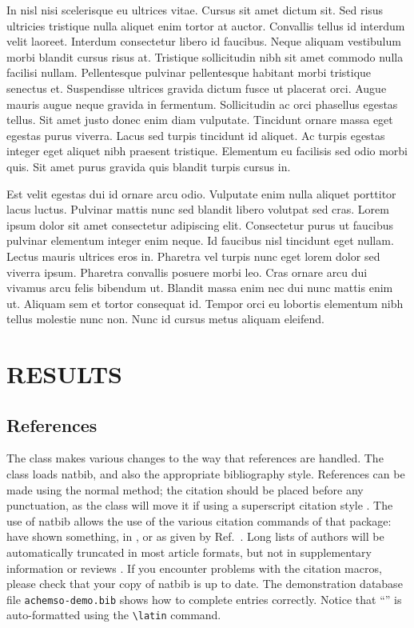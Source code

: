 \documentclass[journal=jctc, manuscript=article]{achemso}
\begin{document}
In nisl nisi scelerisque eu ultrices vitae. Cursus sit amet dictum sit. Sed risus ultricies tristique nulla aliquet enim tortor at auctor. Convallis tellus id interdum velit laoreet. Interdum consectetur libero id faucibus. Neque aliquam vestibulum morbi blandit cursus risus at. Tristique sollicitudin nibh sit amet commodo nulla facilisi nullam. Pellentesque pulvinar pellentesque habitant morbi tristique senectus et. Suspendisse ultrices gravida dictum fusce ut placerat orci. Augue mauris augue neque gravida in fermentum. Sollicitudin ac orci phasellus egestas tellus. Sit amet justo donec enim diam vulputate. Tincidunt ornare massa eget egestas purus viverra. Lacus sed turpis tincidunt id aliquet. Ac turpis egestas integer eget aliquet nibh praesent tristique. Elementum eu facilisis sed odio morbi quis. Sit amet purus gravida quis blandit turpis cursus in.

Est velit egestas dui id ornare arcu odio. Vulputate enim nulla aliquet porttitor lacus luctus. Pulvinar mattis nunc sed blandit libero volutpat sed cras. Lorem ipsum dolor sit amet consectetur adipiscing elit. Consectetur purus ut faucibus pulvinar elementum integer enim neque. Id faucibus nisl tincidunt eget nullam. Lectus mauris ultrices eros in. Pharetra vel turpis nunc eget lorem dolor sed viverra ipsum. Pharetra convallis posuere morbi leo. Cras ornare arcu dui vivamus arcu felis bibendum ut. Blandit massa enim nec dui nunc mattis enim ut. Aliquam sem et tortor consequat id. Tempor orci eu lobortis elementum nibh tellus molestie nunc non. Nunc id cursus metus aliquam eleifend.


\section{RESULTS}


\subsection{References}

The class makes various changes to the way that references are
handled.  The class loads \textsf{natbib}, and also the
appropriate bibliography style.  References can be made using
the normal method; the citation should be placed before any
punctuation, as the class will move it if using a superscript
citation style
\cite{Mena2000,Abernethy2003,Friedman-Hill2003,EuropeanCommission2008}.
The use of \textsf{natbib} allows the use of the various citation
commands of that package: \citeauthor{Abernethy2003} have shown
something, in \citeyear{Cotton1999}, or as given by
Ref.~.  Long lists of authors will be
automatically truncated in most article formats, but not in
supplementary information or reviews \cite{Pople2003}. If you
encounter problems with the citation macros, please check that
your copy of \textsf{natbib} is up to date. The demonstration
database file \texttt{achemso-demo.bib} shows how to complete
entries correctly. Notice that ``'' is auto-formatted
using the \texttt{\textbackslash latin} command.
\end{document}
